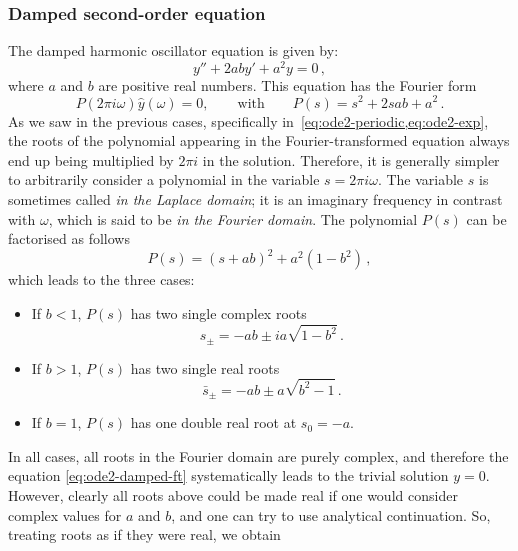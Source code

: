 \subsubsection{Damped second-order equation}
The damped harmonic oscillator equation is given by:
\begin{equation}
  y''+2aby'+a^2y=0\,,
\end{equation}
where $a$ and $b$ are positive real numbers. This equation has the Fourier form
\begin{equation}
  \label{eq:ode2-damped-ft}
  P(2\pi i\omega)\hat{y}(\omega)=0,\qquad\text{with}\qquad
  P(s)=s^2+2sab+a^2\,.
\end{equation}
As we saw in the previous cases, specifically in~\cref{eq:ode2-periodic,eq:ode2-exp}, the
roots of the polynomial appearing in the Fourier-transformed equation always end up being
multiplied by $2\pi i$ in the solution. Therefore, it is generally simpler to arbitrarily
consider a polynomial in the variable $s=2\pi i\omega$. The variable $s$ is sometimes
called \emph{in the Laplace domain}; it is an imaginary frequency in contrast with
$\omega$, which is said to be \emph{in the Fourier domain}. The polynomial $P(s)$ can be
factorised as follows
\begin{equation}
  P(s)=(s+ab)^2+a^2(1-b^2)\,,
\end{equation}
which leads to the three cases:
\begin{itemize}
  \item If $b<1$, $P(s)$ has two single complex roots
        \begin{equation}
          s_{\pm}=-ab\pm ia\sqrt{1-b^2}\,.
        \end{equation}
  \item If $b>1$, $P(s)$ has two single real roots
        \begin{equation}
          \bar{s}_{\pm}=-ab\pm a\sqrt{b^2-1}\,.
        \end{equation}
  \item If $b=1$, $P(s)$ has one double real root at $s_0=-a$.
\end{itemize}
In all cases, all roots in the Fourier domain are purely complex, and therefore the
equation \cref{eq:ode2-damped-ft} systematically leads to the trivial solution $y=0$.
However, clearly all roots above could be made real if one would consider complex values
for $a$ and $b$, and one can try to use analytical continuation. So, treating roots as if
they were real, we obtain
